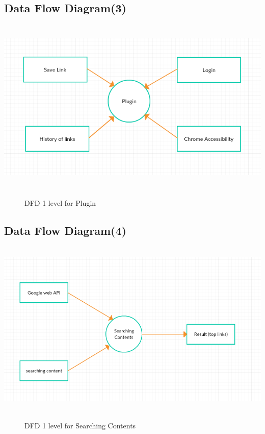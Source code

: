 \subsection{Data Flow Diagram(3)}
\begin{center}
	\includegraphics[width=13.5cm,
	height=8.5cm]{dfd2.png}
	\begin{figure}[h!]
		\centering
		\caption{DFD 1 level for Plugin}%
	\end{figure}
\end{center}
\subsection{Data Flow Diagram(4)}
\begin{center}
	\includegraphics[width=13.5cm,
	height=8.5cm]{search_dfd.png}
	\begin{figure}[h!]
		\centering
		\caption{DFD 1 level for Searching Contents}%
	\end{figure}
\end{center}

